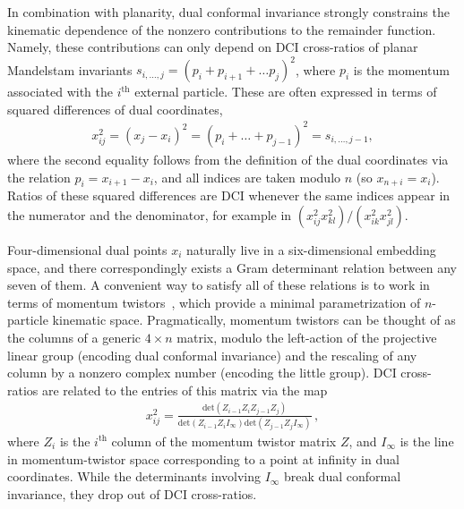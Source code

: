 \documentclass[11pt]{article}
\begin{document}
In combination with planarity, dual conformal invariance strongly constrains the kinematic dependence of the nonzero contributions to the remainder function. Namely, these contributions can only depend on DCI cross-ratios of planar Mandelstam invariants $s_{i,\dots,j} = (p_i + p_{i+1} + \dots p_{j})^2$, where $p_i$ is the momentum associated with the $i^{\text{th}}$ external particle. These are often expressed in terms of squared differences of dual coordinates, 
\begin{align}
x_{ij}^2 = (x_j - x_i)^2 = (p_i+ \dots + p_{j-1})^2 = s_{i,\dots,j-1},
\end{align}
where the second equality follows from the definition of the dual coordinates via the relation $p_i = x_{i+1} - x_i$, and all indices are taken modulo $n$ (so $x_{n+i} = x_i$). Ratios of these squared differences are DCI whenever the same indices appear in the numerator and the denominator, for example in $(x_{ij}^2 x_{kl}^2)/(x_{ik}^2 x_{jl}^2)$.  

Four-dimensional dual points $x_i$ naturally live in a six-dimensional embedding space, and there correspondingly exists a Gram determinant relation between any seven of them. A convenient way to satisfy all of these relations is to work in terms of momentum twistors~\cite{Hodges:2009hk}, which provide a minimal parametrization of $n$-particle kinematic space. Pragmatically, momentum twistors can be thought of as the columns of a generic $4\! \times \! n$ matrix, modulo the left-action of the projective linear group (encoding dual conformal invariance) and the rescaling of any column by a nonzero complex number (encoding the little group). DCI cross-ratios are related to the entries of this matrix via the map
\begin{align}
x_{ij}^2 = \frac{\text{det}(Z_{i-1} Z_i Z_{j-1} Z_j)}{\text{det}(Z_{i-1} Z_i I_\infty) \text{det}(Z_{j-1} Z_j I_\infty)}  \, ,
\end{align} 
where $Z_i$ is the $i^\text{th}$ column of the momentum twistor matrix $Z$, and $I_\infty$ is the line in momentum-twistor space corresponding to a point at infinity in dual coordinates. While the determinants involving $I_\infty$ break dual conformal invariance, they drop out of DCI cross-ratios. 
\end{document}
